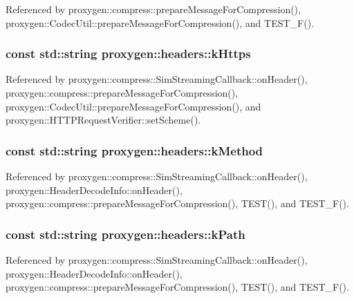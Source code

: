 Referenced by proxygen\+::compress\+::prepare\+Message\+For\+Compression(), proxygen\+::\+Codec\+Util\+::prepare\+Message\+For\+Compression(), and T\+E\+S\+T\+\_\+\+F().

\subsubsection[{k\+Https}]{\setlength{\rightskip}{0pt plus 5cm}const std\+::string proxygen\+::headers\+::k\+Https}\label{namespaceproxygen_1_1headers_abb0d7b63fa52832d0233ded8bfd5c48e}


Referenced by proxygen\+::compress\+::\+Sim\+Streaming\+Callback\+::on\+Header(), proxygen\+::compress\+::prepare\+Message\+For\+Compression(), proxygen\+::\+Codec\+Util\+::prepare\+Message\+For\+Compression(), and proxygen\+::\+H\+T\+T\+P\+Request\+Verifier\+::set\+Scheme().

\subsubsection[{k\+Method}]{\setlength{\rightskip}{0pt plus 5cm}const std\+::string proxygen\+::headers\+::k\+Method}\label{namespaceproxygen_1_1headers_a3a170aa48a4ff03d5b70c309cb119857}


Referenced by proxygen\+::compress\+::\+Sim\+Streaming\+Callback\+::on\+Header(), proxygen\+::\+Header\+Decode\+Info\+::on\+Header(), proxygen\+::compress\+::prepare\+Message\+For\+Compression(), T\+E\+S\+T(), and T\+E\+S\+T\+\_\+\+F().

\subsubsection[{k\+Path}]{\setlength{\rightskip}{0pt plus 5cm}const std\+::string proxygen\+::headers\+::k\+Path}\label{namespaceproxygen_1_1headers_ae53fca9e2d006107694cb702f87924c4}


Referenced by proxygen\+::compress\+::\+Sim\+Streaming\+Callback\+::on\+Header(), proxygen\+::\+Header\+Decode\+Info\+::on\+Header(), proxygen\+::compress\+::prepare\+Message\+For\+Compression(), T\+E\+S\+T(), and T\+E\+S\+T\+\_\+\+F().

